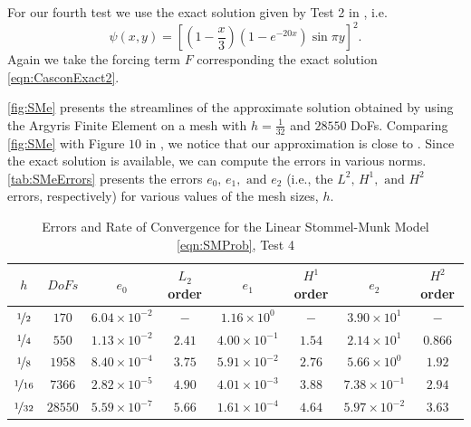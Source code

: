 For our fourth test we use the exact solution given by Test 2 in \cite{Cascon},
i.e.
{\small
\begin{equation}
  \psi(x,y) = \left[\left(1 - \frac{x}{3}\right)\left(1-e^{-20x}\right) \sin \pi y\right]^2.
  \label{eqn:CasconExact2}
\end{equation}
}
Again we take the forcing term $F$ corresponding the exact solution
\eqref{eqn:CasconExact2}.

\autoref{fig:SMe} presents the streamlines of the approximate solution obtained
by using the Argyris Finite Element on a mesh with $h=\frac{1}{32}$ and $28550$
DoFs. Comparing \autoref{fig:SMe} with Figure $10$ in \cite{Myers}, we notice
that our approximation is close to \cite{Myers}. Since the exact solution is
available, we can compute the errors in various norms. \autoref{tab:SMeErrors}
presents the errors $e_0,\, e_1, \text{ and } e_2$ (i.e., the $L^2,\, H^1,
\text{ and } H^2$ errors, respectively) for various values of the mesh sizes,
$h$.

\begin{table}%
\begin{center}
\begin{tabular}{|c|c|c|c|c|c|c|c|}%
  \hline
  $h$ & $DoFs$ & $e_0$ & $L_2$ order & $e_1$ & $H^1$ order & $e_2$ & $H^2$ order \\[0.2em] %
  \hline
  $\nicefrac{1}{2}$ & $170$ & $6.04\times 10^{-2}$ & $-$ & $1.16\times 10^0$ & $-$ & $3.90\times 10^1$ & $-$ \\[0.2em] %
  $\nicefrac{1}{4}$ & $550$ & $1.13\times 10^{-2}$ & $2.41$ & $4.00\times 10^{-1}$ & $1.54$ & $2.14\times 10^1$ & $0.866$ \\[0.2em] %
  $\nicefrac{1}{8}$ & $1958$ & $8.40\times 10^{-4}$ & $3.75$ & $5.91\times 10^{-2}$ & $2.76$ & $5.66\times 10^0$ & $1.92$ \\[0.2em] %
  $\nicefrac{1}{16}$ & $7366$ & $2.82\times 10^{-5}$ & $4.90$ & $4.01\times 10^{-3}$ & $3.88$ & $7.38\times 10^{-1}$ & $2.94$ \\[0.2em] %
  $\nicefrac{1}{32}$ & $28550$ & $5.59\times 10^{-7}$ & $5.66$ & $1.61\times 10^{-4}$ & $4.64$ & $5.97\times 10^{-2}$ & $3.63$ \\[0.2em] %
 \hline
\end{tabular}
\end{center}
\caption{Errors and Rate of Convergence for the Linear Stommel-Munk Model \eqref{eqn:SMProb}, Test 4 \cite{Cascon}}
\label{tab:SMeErrors}
\end{table}

